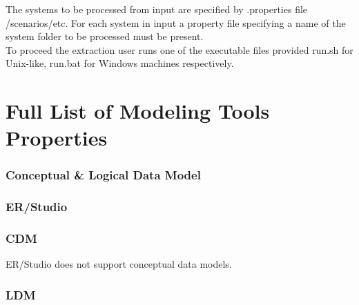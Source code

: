 \documentclass[12pt,a4paper]{report}
\begin{document}
The systems to be processed from input are specified by .properties file   /scenarios/etc. 
For each system in input a property file specifying a name of the system folder to be processed must be present. \\ 

To proceed the extraction user runs one of the executable files provided \textunderscore run.sh for Unix-like, \textunderscore run.bat for Windows machines respectively.

\section{Full List of Modeling Tools Properties}

\subsubsection{Conceptual \& Logical Data Model}

\subsubsection{ER/Studio}

\subsubsection{CDM}

ER/Studio does not support conceptual data models.

\subsubsection{LDM}
\end{document}
